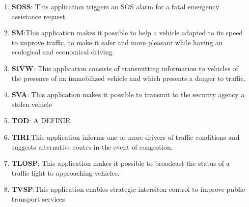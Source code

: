 \begin{enumerate}
\item \textbf{\acrlong{SOSS}}: This application triggers an SOS alarm for a fatal emergency assistance request. \cite{etsi_etsi_tr_102_638_intelligent_2009,al-sultan_comprehensive_2014}
\item \textbf{\acrfull{SM}}:This application makes it possible to help a vehicle adapted to its speed to improve traffic, to make it safer and more pleasant while having an ecological and economical driving. \cite{etsi_etsi_tr_102_638_intelligent_2009,karagiannis_vehicular_2011,rakha_eco-driving_2011,xiuzheng_model_2015,usdt_intelligent_2021}
\item \textbf{\acrfull{StVW}}: This application consists of transmitting information to vehicles of the presence of an immobilized vehicle and which presents a danger to traffic. \cite{etsi_etsi_tr_102_638_intelligent_2009,karagiannis_vehicular_2011}
\item \textbf{\acrfull{SVA}}: This application makes it possible to transmit to the security agency a stolen vehicle \cite{etsi_etsi_tr_102_638_intelligent_2009}
\item \textbf{\acrfull{TOD}}: A DEFINIR
\item \textbf{\acrfull{TIRI}}:This application informs one or more drivers of traffic conditions and suggests alternative routes in the event of congestion. \cite{etsi_etsi_tr_102_638_intelligent_2009,xu_dsrc_2017,ngmn_alliance_perspectives_2016,usdt_intelligent_2021}
\item \textbf{\acrfull{TLOSP}}: This application makes it possible to broadcast the status of a traffic light to approaching vehicles. \cite{etsi_etsi_tr_102_638_intelligent_2009,vandung_nguyen_efficient_2016,usdt_intelligent_2021}
\item \textbf{\acrfull{TVSP}}:This application enables strategic intersiton control to improve public transport services \cite{hu_transit_2014,hu_coordinated_2015,yang_implementing_2019,lee_transit_2017,zeng_potential_2012,he_multi-modal_2014}

\end{enumerate}
